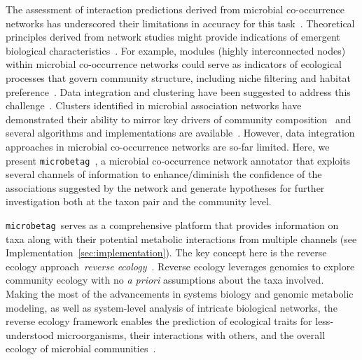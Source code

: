 \documentclass[sn-mathphys,Numbered]{sn-jnl}  %
\theoremstyle{thmstyleone}%
\theoremstyle{thmstyletwo}%
\theoremstyle{thmstylethree}%
\newcommand{\microbetag}{\texttt{microbetag }}
\begin{document}
    The assessment of interaction predictions derived from microbial co-occurrence networks has underscored their limitations in accuracy for this task~\cite{berry2014deciphering}.
    Theoretical principles derived from network studies might provide indications of emergent biological characteristics~\cite{rottjers2018hairballs, guo2022microbial}. 
    For example, modules (highly interconnected nodes) within microbial co-occurrence networks could serve as indicators of ecological processes that govern community structure, including niche filtering and habitat preference~\cite{ma2020earth}.
    Data integration and clustering have been suggested to address this challenge~\cite{faust2021open}.
    Clusters identified in microbial association networks have demonstrated their ability to mirror key drivers of community composition~\cite{guidi2016plankton} and several algorithms and implementations are available~\cite{rottjers2020manta}.
    However, data integration approaches in microbial co-occurrence networks are so-far limited.
    Here, we present \microbetag, a microbial co-occurrence network annotator that exploits several channels of information to enhance/diminish the confidence of the associations suggested by the network and generate hypotheses for further investigation both at the taxon pair and the community level.

    \microbetag serves as a comprehensive platform that provides information on taxa along with their potential metabolic interactions from multiple channels 
    (see Implementation~\ref{sec:implementation}).
    The key concept here is the reverse ecology approach~\textit{reverse ecology}~\cite{levy2012reverse}.
    Reverse ecology leverages genomics to explore community ecology with no \textit{a priori} assumptions about the taxa involved.
    Making the most of the advancements in systems biology and genomic metabolic modeling, as well as system-level analysis of intricate biological networks, the reverse ecology framework enables the prediction of ecological traits for less-understood microorganisms, their interactions with others, and the overall ecology of microbial communities~\cite{levy2014metagenomic}.
\end{document}
